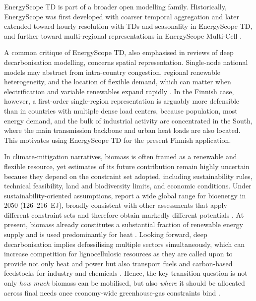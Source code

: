 \documentclass{article}
\begin{document}
EnergyScope TD is part of a broader open modelling family. Historically, EnergyScope was first developed with coarser temporal aggregation and later extended toward hourly resolution with TDs and seasonality in EnergyScope TD, and further toward multi-regional representations in EnergyScope Multi-Cell \citep{hernandezEnergyScopeMultiCellNovel2021,thiranExploringOptionsFossilfree2025,borasioDeepDecarbonisationRegional2022}.

A common critique of EnergyScope TD, also emphasised in reviews of deep decarbonisation modelling, concerns spatial representation. Single-node national models may abstract from intra-country congestion, regional renewable heterogeneity, and the location of flexible demand, which can matter when electrification and variable renewables expand rapidly \citep{borasioDeepDecarbonisationRegional2022,limpensEnergyScopePathwayOpensource2024}. In the Finnish case, however, a first-order single-region representation is arguably more defensible than in countries with multiple dense load centers, because population, most energy demand, and the bulk of industrial activity are concentrated in the South, where the main transmission backbone and urban heat loads are also located. This motivates using EnergyScope TD for the present Finnish application.


In climate-mitigation narratives, biomass is often framed as a renewable and flexible resource, yet estimates of its future contribution remain highly uncertain because they depend on the constraint set adopted, including sustainability rules, technical feasibility, land and biodiversity limits, and economic conditions. Under sustainability-oriented assumptions, \citet{beringer_bioenergy_2011} report a wide global range for bioenergy in 2050 (126--216~EJ), broadly consistent with other assessments that apply different constraint sets and therefore obtain markedly different potentials \citep{haberl_global_2010,schueler_global_2013,searle_reassessment_2015,strapasson_global_2017,iea_bioenergy_2023}. At present, biomass already constitutes a substantial fraction of renewable energy supply and is used predominantly for heat \citep{iea_key_2020,iea_bioenergy_2023}. Looking forward, deep decarbonisation implies defossilising multiple sectors simultaneously, which can increase competition for lignocellulosic resources as they are called upon to provide not only heat and power but also transport fuels and carbon-based feedstocks for industry and chemicals \citep{wwf_energy_2011,daioglou_competing_2015}. Hence, the key transition question is not only \emph{how much} biomass can be mobilised, but also \emph{where} it should be allocated across final needs once economy-wide greenhouse-gas constraints bind \citep{collaOptimalUseLignocellulosic2022}.
\end{document}
